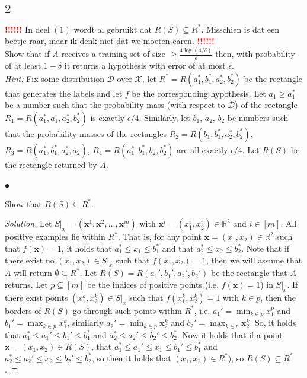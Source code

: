 \documentclass[10pt, a4paper, twoside]{amsart}
\newcommand{\R}{\ensuremath{\mathbb{R}}}
\newcommand{\se}{\ensuremath{\subseteq}}
\newenvironment{solution}
               {\let\oldqedsymbol=\qedsymbol
                \renewcommand{\qedsymbol}{$\blacktriangleleft$}
                \begin{proof}[Solution]}
               {\end{proof}
                \renewcommand{\qedsymbol}{\oldqedsymbol}}
\newcommand{\TODO}{\textcolor{red}{\textbf{!!!!!! }}}
\begin{document}
\subsection*{$2$}
\TODO In deel $(1)$ wordt al gebruikt dat $R(S) \se R^*$. Misschien is dat een beetje raar, 
maar ik denk niet dat we moeten caren. \TODO \\

Show that if $A$ receives a training set of size $\geq \frac{4 \log (4/\delta)}{\epsilon}$ then, with probability of at least $1-\delta$ it returns a hypothesis with error  of at most $\epsilon$.\\
\textit{Hint:} Fix some distribution $\mathcal{D}$ over $\mathcal{X}$, let $R^* = R(a_1^*,b_1^*,a_2^*,b_2^*)$ be the rectangle that generates the labels and let $f$ be the corresponding hypothesis. Let $a_1 \geq a_1^*$ be a number such that the probability mass (with respect to $\mathcal{D}$) of the rectangle $R_1 = R(a_1^*,a_1,a_2^*,b_2^*)$ is exactly $\epsilon/4$. Similarly, let $b_1$, $a_2$, $b_2$ be numbers such that the probability masses of the rectangles $R_2 = R(b_1,b_1^*,a_2^*,b_2^*)$, $R_3 =  R(a_1^*,b_1^*,a_2^*,a_2)$, $R_4 =  R(a_1^*,b_1^*,b_2,b_2^*)$ are all exactly $\epsilon/4$. Let $R(S)$ be the rectangle returned by $A$.

\subsubsection*{$\bullet$} 
Show that $R(S)\subseteq R^*$.

\begin{solution}
Let $S|_x = (\mathbf{x}^1, \mathbf{x}^2,\ldots, \mathbf{x}^m)$ with $\mathbf{x}^i = (x_1^i,x_2^i) \in \R^2$ and $i \in [m]$.
All positive examples lie within $R^*$. That is, for any point $\mathbf{x} = (x_1,x_2) \in \R^2$ such that $f(\mathbf{x})=1$, it holds that $a_1^*\leq x_1 \leq b_1^*$ and that $a_2^*\leq x_2 \leq b_2^*$. Note that if there exist no $(x_1,x_2) \in S|_x$ such that $f(x_1,x_2)=1$, then we will assume that $A$ will return $\emptyset \subseteq R^*$. Let $R(S) = R(a_1',b_1',a_2',b_2')$ be the rectangle that $A$ returns. Let $p \subseteq [m]$ be the indices of positive points (i.e. $f(\mathbf{x})=1$) in $S|_x$. If there exist points $(x^k_1,x^k_2)\in S|_x$ such that $f(x^k_1,x^k_2)=1$ with $k \in p$, then the borders of $R(S)$ go through such points within $R^*$, i.e. $a_1' = \min_{k\in p} x^p_1$ and $b_1' = \max_{k\in p} x^k_1$, similarly $a_2' = \min_{k\in p} \mathbf{x}^k_2$ and $b_2' = \max_{k\in p} \mathbf{x}^k_2$. So, it holds that $a_1^*\leq a_1'\leq b_1' \leq b_1^*$ and $a_2^* \leq a_2' \leq b_2' \leq b_2^*$. Now it holds that if a point $\mathbf{x} = (x_1, x_2)\in R(S)$, that $a_1^*\leq a_1'\leq x_1 \leq b_1' \leq b_1^*$ and $a_2^* \leq a_2'\leq x_2 \leq b_2' \leq b_2^*$, so then it holds that $(x_1,x_2) \in R^*)$, so $R(S) \subseteq R^*$.
\end{solution}
\end{document}
